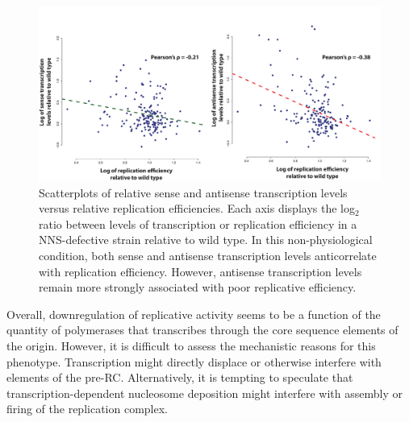 \begin{figure}[h]

\centering
\includegraphics[width=\textwidth]{figures/results/JScorrelations}
\caption[correlations between transcription and replication efficiency in a NNS defective strain]{Scatterplots of relative sense and antisense transcription levels versus relative replication efficiencies. Each axis displays the log$_2$ ratio between levels of transcription or replication efficiency in a NNS-defective strain relative to wild type. In this non-physiological condition, both sense and antisense transcription levels anticorrelate with replication efficiency. However, antisense transcription levels remain more strongly associated with poor replicative efficiency.}
\label{fig:model}

\end{figure} 


Overall, downregulation of replicative activity seems to be a function of the quantity of polymerases that transcribes through the core sequence elements of the origin. However, it is difficult to assess the mechanistic reasons for this phenotype. Transcription might directly displace or otherwise interfere with elements of the pre-RC. Alternatively, it is tempting to speculate that transcription-dependent nucleosome deposition might interfere with assembly or firing of the replication complex.
